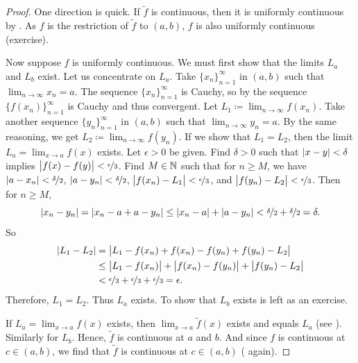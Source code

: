 \begin{proof}
One direction is quick.  If $\widetilde{f}$ is continuous, then
it is uniformly continuous by .  As $f$ is the
restriction of $\widetilde{f}$ to $(a,b)$, $f$ is also uniformly continuous
(exercise).

Now suppose $f$ is uniformly continuous.  We must first show
that the limits $L_a$ and $L_b$ exist.  Let us concentrate on $L_a$.
Take $\{ x_n \}_{n=1}^\infty$ in $(a,b)$ such that
$\lim_{n\to\infty} x_n = a$.
The sequence $\{ x_n \}_{n=1}^\infty$ is Cauchy, so by
the sequence $\bigl\{ f(x_n) \bigr\}_{n=1}^\infty$ is Cauchy and thus convergent.
Let $L_1 \coloneqq \lim_{n\to\infty} f(x_n)$.  Take another sequence
$\{ y_n \}_{n=1}^\infty$ in $(a,b)$ such that $\lim_{n\to\infty} y_n = a$.
By the same reasoning,
we get $L_2 \coloneqq \lim_{n\to\infty} f(y_n)$.  If we show that $L_1 = L_2$, then
the limit $L_a = \lim_{x\to a} f(x)$ exists.  Let $\epsilon > 0$ be given.
Find $\delta > 0$ such that $\lvert {x-y} \rvert < \delta$ implies $\bigl\lvert {f(x)-f(y)} \bigr\rvert <
\nicefrac{\epsilon}{3}$.  Find $M \in {\mathbb{N}}$ such that for
$n \geq M$, we have $\lvert {a-x_n} \rvert < \nicefrac{\delta}{2}$,
$\lvert {a-y_n} \rvert < \nicefrac{\delta}{2}$,
$\bigl\lvert {f(x_n)-L_1} \bigr\rvert < \nicefrac{\epsilon}{3}$, and
$\bigl\lvert {f(y_n)-L_2} \bigr\rvert < \nicefrac{\epsilon}{3}$.  Then for $n \geq M$,
\begin{equation*}
\lvert {x_n-y_n} \rvert = 
\lvert {x_n-a+a-y_n} \rvert \leq
\lvert {x_n-a} \rvert+\lvert {a-y_n} \rvert < \nicefrac{\delta}{2} + \nicefrac{\delta}{2} =
\delta.
\end{equation*}
So
\begin{equation*}
\begin{split}
\lvert {L_1-L_2} \rvert &=
\bigl\lvert {L_1-f(x_n)+f(x_n)-f(y_n)+f(y_n)-L_2} \bigr\rvert \\
& \leq 
\bigl\lvert {L_1-f(x_n)} \bigr\rvert+\bigl\lvert {f(x_n)-f(y_n)} \bigr\rvert+\bigl\lvert {f(y_n)-L_2} \bigr\rvert \\
& <
\nicefrac{\epsilon}{3} + \nicefrac{\epsilon}{3} + \nicefrac{\epsilon}{3}
=
\epsilon .
\end{split}
\end{equation*}
Therefore, $L_1 = L_2$.
Thus $L_a$ exists.  To show that $L_b$ exists is left as an exercise.

If $L_a = \lim_{x\to a} f(x)$
exists, then $\lim_{x\to a} \widetilde{f}(x)$ exists
and equals $L_a$
(see ).  Similarly for $L_b$.
Hence, $\widetilde{f}$ is continuous at $a$ and $b$.  
And since $f$ is continuous at $c \in (a,b)$,
we find that
$\widetilde{f}$ is continuous at $c \in (a,b)$ ( again).
\end{proof}

